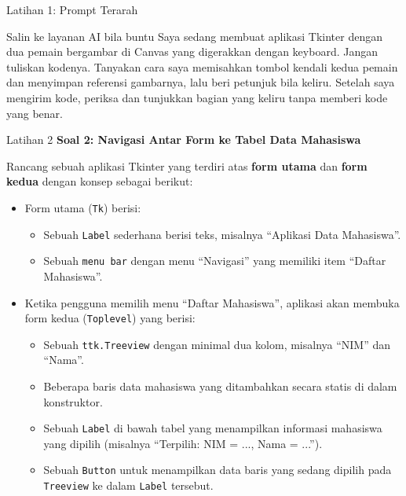 \documentclass[aspectratio=169, table]{beamer}
\begin{document}
\begin{frame}{Latihan 1: Prompt Terarah}
\begin{block}{Salin ke layanan AI bila buntu}
\small Saya sedang membuat aplikasi Tkinter dengan dua pemain bergambar di Canvas yang digerakkan dengan keyboard. Jangan tuliskan kodenya. Tanyakan cara saya memisahkan tombol kendali kedua pemain dan menyimpan referensi gambarnya, lalu beri petunjuk bila keliru. Setelah saya mengirim kode, periksa dan tunjukkan bagian yang keliru tanpa memberi kode yang benar.
\end{block}
\end{frame}

\begin{frame}[fragile,allowframebreaks=0.8]{Latihan 2}
\footnotesize
\textbf{Soal 2: Navigasi Antar Form ke Tabel Data Mahasiswa}\par\medskip
Rancang sebuah aplikasi Tkinter yang terdiri atas \textbf{form utama} dan \textbf{form kedua} dengan konsep sebagai berikut:
\begin{itemize}
    \item Form utama (\texttt{Tk}) berisi:
          \begin{itemize}
              \item Sebuah \texttt{Label} sederhana berisi teks, misalnya ``Aplikasi Data Mahasiswa''.
              \item Sebuah \texttt{menu bar} dengan menu ``Navigasi'' yang memiliki item ``Daftar Mahasiswa''.
          \end{itemize}
    \item Ketika pengguna memilih menu ``Daftar Mahasiswa'', aplikasi akan membuka form kedua (\texttt{Toplevel}) yang berisi:
          \begin{itemize}
              \item Sebuah \texttt{ttk.Treeview} dengan minimal dua kolom, misalnya ``NIM'' dan ``Nama''.
              \item Beberapa baris data mahasiswa yang ditambahkan secara statis di dalam konstruktor.
              \item Sebuah \texttt{Label} di bawah tabel yang menampilkan informasi mahasiswa yang dipilih (misalnya ``Terpilih: NIM = ..., Nama = ...'').
              \item Sebuah \texttt{Button} untuk menampilkan data baris yang sedang dipilih pada \texttt{Treeview} ke dalam \texttt{Label} tersebut.
          \end{itemize}
\end{itemize}

\end{frame}
\end{document}
